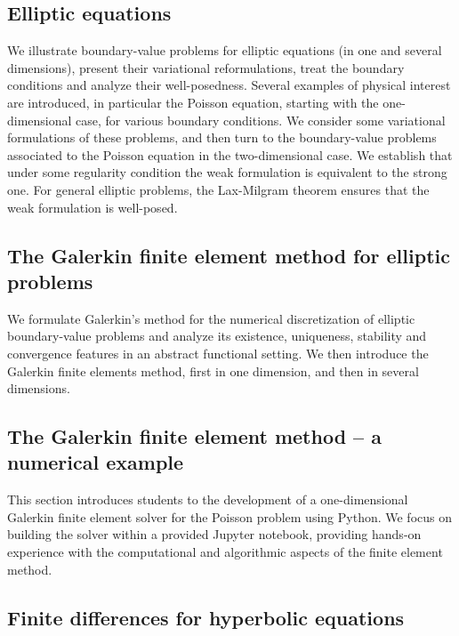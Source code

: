 \documentclass{article}
\begin{document}
\subsection{Elliptic equations}

We illustrate boundary-value problems for elliptic equations (in one and
several dimensions), present their variational reformulations, treat the
boundary conditions and analyze their well-posedness. Several examples of
physical interest are introduced, in particular the Poisson equation, starting
with the one-dimensional case, for various boundary conditions. We consider
some variational formulations of these problems, and then turn to the
boundary-value problems associated to the Poisson equation in the
two-dimensional case. We establish that under some regularity condition the
weak formulation is equivalent to the strong one. For general elliptic
problems, the Lax-Milgram theorem ensures that the weak formulation is
well-posed. 

\subsection{The Galerkin finite element method for elliptic problems}

We formulate Galerkin’s method for the numerical discretization of elliptic
boundary-value problems and analyze its existence, uniqueness, stability and
convergence features  in an abstract functional setting. We then introduce the
Galerkin finite elements method, first in one dimension, and then in several
dimensions.

\subsection{The Galerkin finite element method -- a numerical example}

This section introduces students to the development of a one-dimensional
Galerkin finite element solver for the Poisson problem using Python. We focus
on building the solver within a provided Jupyter notebook, providing hands-on
experience with the computational and algorithmic aspects of the finite element
method.

\subsection{Finite differences for hyperbolic equations}
\end{document}
